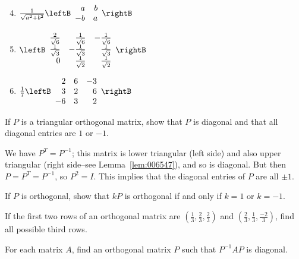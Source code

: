 \begin{multicols}{2}
\begin{ex}
\begin{sol}
\begin{enumerate}[label={\alph*.}]
\setcounter{enumi}{3}
\item  $\frac{1}{\sqrt{a^2 + b^2}}\leftB \begin{array}{rr}
a & b \\
-b & a
\end{array}\rightB$

\setcounter{enumi}{5}
\item  $\leftB \begin{array}{rrr}
\frac{2}{\sqrt{6}} & \frac{1}{\sqrt{6}} & -\frac{1}{\sqrt{6}}\\
\frac{1}{\sqrt{3}} & -\frac{1}{\sqrt{3}} & \frac{1}{\sqrt{3}} \\
0 & \frac{1}{\sqrt{2}} & \frac{1}{\sqrt{2}}
\end{array}\rightB$


\setcounter{enumi}{7}
\item  $\frac{1}{7}\leftB \begin{array}{rrr}
2 & 6 & -3 \\
3 & 2 & 6 \\
-6 & 3 & 2
\end{array}\rightB$

\end{enumerate}
\end{sol}
\end{ex}

\begin{ex}
If $P$ is a triangular orthogonal matrix, show that $P$ is diagonal and that all diagonal entries are $1$ or $-1$.

\begin{sol}
We have $P^{T} = P^{-1}$; this matrix is lower triangular (left side) and also upper triangular (right side--see Lemma~\ref{lem:006547}), and so is diagonal. But then $P = P^{T} = P^{-1}$, so $P^{2} = I$. This implies that the diagonal entries of $P$ are all $\pm 1$.
\end{sol}
\end{ex}

\begin{ex}
If $P$ is orthogonal, show that $kP$ is orthogonal if and only if $k = 1$ or $k = -1$.
\end{ex}

\begin{ex}
If the first two rows of an orthogonal matrix are $(\frac{1}{3}, \frac{2}{3}, \frac{2}{3})$ and $(\frac{2}{3}, \frac{1}{3}, \frac{-2}{3})$, find all possible third rows.
\end{ex}

\begin{ex}
For each matrix $A$, find an orthogonal matrix $P$ such that $P^{-1}AP$ is diagonal.


\end{ex}
\end{multicols}
